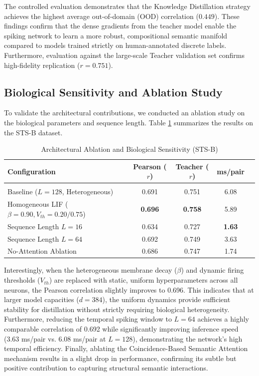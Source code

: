 \documentclass{article} %
\begin{document}
The controlled evaluation demonstrates that the Knowledge Distillation strategy achieves the highest average out-of-domain (OOD) correlation ($0.449$). These findings confirm that the dense gradients from the teacher model enable the spiking network to learn a more robust, compositional semantic manifold compared to models trained strictly on human-annotated discrete labels. Furthermore, evaluation against the large-scale Teacher validation set confirms high-fidelity replication ($r=0.751$).

\subsection{Biological Sensitivity and Ablation Study}
To validate the architectural contributions, we conducted an ablation study on the biological parameters and sequence length. Table \ref{tab:ablation} summarizes the results on the STS-B dataset. 

\begin{table}[h]
\caption{Architectural Ablation and Biological Sensitivity (STS-B)}
\label{tab:ablation}
\begin{center}
\begin{tabular}{lcccc}
\multicolumn{1}{l}{\bf Configuration} &\multicolumn{1}{c}{\bf Pearson ($r$)} &\multicolumn{1}{c}{\bf Teacher ($r$)} &\multicolumn{1}{c}{\bf ms/pair}
\\ \hline \\
Baseline ($L=128$, Heterogeneous) & 0.691 & 0.751 & 6.08 \\
\hline
Homogeneous LIF ($\beta=0.90, V_{th}=0.20/0.75$) & \textbf{0.696} & \textbf{0.758} & 5.89 \\
Sequence Length $L=16$ & 0.634 & 0.727 & \textbf{1.63} \\
Sequence Length $L=64$ & 0.692 & 0.749 & 3.63 \\
No-Attention Ablation & 0.686 & 0.747 & 1.74 \\
\end{tabular}
\end{center}
\end{table}

Interestingly, when the heterogeneous membrane decay ($\beta$) and dynamic firing thresholds ($V_{th}$) are replaced with static, uniform hyperparameters across all neurons, the Pearson correlation slightly improves to 0.696. This indicates that at larger model capacities ($d=384$), the uniform dynamics provide sufficient stability for distillation without strictly requiring biological heterogeneity. Furthermore, reducing the temporal spiking window to $L=64$ achieves a highly comparable correlation of 0.692 while significantly improving inference speed (3.63 ms/pair vs. 6.08 ms/pair at $L=128$), demonstrating the network's high temporal efficiency. Finally, ablating the Coincidence-Based Semantic Attention mechanism results in a slight drop in performance, confirming its subtle but positive contribution to capturing structural semantic interactions.
\end{document}
